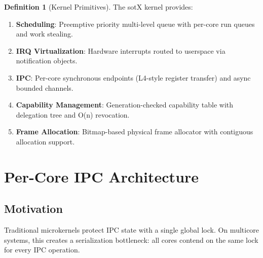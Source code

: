 \documentclass[11pt,letterpaper]{article}
\theoremstyle{definition}
\newtheorem{definition}{Definition}[section]
\begin{document}
\begin{definition}[Kernel Primitives]
The sotX kernel provides:
\begin{enumerate}[nosep]
    \item \textbf{Scheduling}: Preemptive priority multi-level queue with
          per-core run queues and work stealing.
    \item \textbf{IRQ Virtualization}: Hardware interrupts routed to userspace
          via notification objects.
    \item \textbf{IPC}: Per-core synchronous endpoints (L4-style register
          transfer) and async bounded channels.
    \item \textbf{Capability Management}: Generation-checked capability table
          with delegation tree and O(n) revocation.
    \item \textbf{Frame Allocation}: Bitmap-based physical frame allocator
          with contiguous allocation support.
\end{enumerate}
\end{definition}

\section{Per-Core IPC Architecture}
\label{sec:ipc}

\subsection{Motivation}

Traditional microkernels protect IPC state with a single global lock. On
multicore systems, this creates a serialization bottleneck: all cores contend
on the same lock for every IPC operation.
\end{document}
